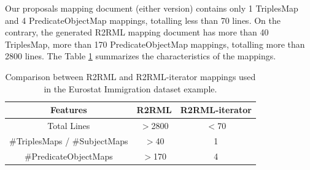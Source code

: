 Our proposals mapping document (either version) contains only 1 TriplesMap and 4 PredicateObjectMap mappings, totalling less than 70 lines. On the contrary, the generated R2RML mapping document has more than 40 TriplesMap, more than 170 PredicateObjectMap mappings, totalling more than 2800 lines. The Table \ref{table:compare2} summarizes the characteristics of the mappings.
\begin{table}[tbp]
\caption[R2RML vs R2RML-iterator in Eurostat dataset]{Comparison between R2RML and R2RML-iterator mappings used in the Eurostat Immigration dataset example.}
\label{table:compare2}
\begin{tabular}{c|c|c}
\hline
\textbf{Features} & \textbf{R2RML}   & \textbf{R2RML-iterator}  \\ \hline
Total Lines   & $>$2800 & $<$70 \\ 
\#TriplesMaps / \#SubjectMaps     & $>$40                & 1           \\
\#PredicateObjectMaps  & $>$170              & 4            \\ \hline
\end{tabular}
\end{table}